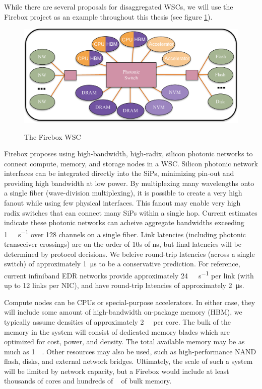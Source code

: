 While there are several proposals for disaggregated WSCs, we will use the
Firebox\cite{firebox} project as an example throughout this thesis (see figure
\ref{fig:fb_diagram}).

\begin{figure}
    \centering
    \includegraphics[width=0.9\columnwidth]{figs/FBDiagram.pdf} \label{fig:fb_diagram}
    \vspace{-5mm}
    \caption{The Firebox WSC}
\end{figure}

Firebox proposes using high-bandwidth, high-radix, silicon photonic networks to
connect compute, memory, and storage nodes in a WSC. Silicon photonic network
interfaces can be integrated directly into the SiPs, minimizing pin-out and
providing high bandwidth at low power. By multiplexing many wavelengths onto a
single fiber (wave-division multiplexing), it is possible to create a very high
fanout while using few physical interfaces. This fanout may enable very high
radix switches that can connect many SiPs within a single hop. Current
estimates indicate these photonic networks can acheive aggregate bandwidths
exceeding \SI{1}{\tera\bit\per\second} over 128 channels on a single
fiber\cite{naturePhotonic}\cite{Photonic09}. Link latencies (including photonic
transceiver crossings) are on the order of 10s of
\si{\nano\second}, but final latencies will
be determined by protocol decisions. We beleive round-trip latencies (across a
single switch) of approximately \SI{1}{\micro\second} to be a conservative prediction. For
reference, current infiniband EDR networks provide approximately
\SI{24}{\giga\bit\per\second} per
link (with up to 12 links per NIC), and have round-trip latencies of
approximately \SI{2}{\micro\second}\cite{binnigNW}.

Compute nodes can be CPUs or special-purpose accelerators. In either case, they
will include some amount of high-bandwidth on-package memory (HBM), we
typically assume densities of approximately \SI{2}{\giga\byte} per core. The bulk of the memory
in the system will consist of dedicated memory blades which are optimized for
cost, power, and density. The total available memory may be as much as
\SI{1}{\peta\byte}.
Other resources may also be used, such as high-performance NAND flash, disks,
and external network bridges. Ultimately, the scale of such a system will be
limited by network capacity, but a Firebox would include at least thousands of
cores and hundreds of \si{\tera\byte} of bulk memory.

